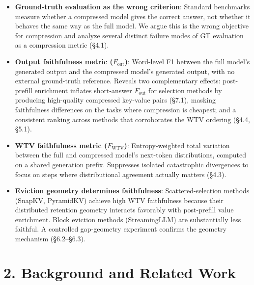 \documentclass[10pt,letterpaper]{article}
\begin{document}
\begin{itemize}
\item
  \textbf{Ground-truth evaluation as the wrong criterion}: Standard
  benchmarks measure whether a compressed model gives the correct
  answer, not whether it behaves the same way as the full model. We
  argue this is the wrong objective for compression and analyze several
  distinct failure modes of GT evaluation as a compression metric
  (§4.1).
\item
  \textbf{Output faithfulness metric (\(F_{\text{out}}\))}: Word-level
  F1 between the full model's generated output and the compressed
  model's generated output, with no external ground-truth reference.
  Reveals two complementary effects: post-prefill enrichment inflates
  short-answer \(F_{\text{out}}\) for selection methods by producing
  high-quality compressed key-value pairs (§7.1), masking faithfulness
  differences on the tasks where compression is cheapest; and a consistent
  ranking across methods that corroborates the WTV ordering (§4.4, §5.1).
\item
  \textbf{WTV faithfulness metric (\(F_{\text{WTV}}\))}: Entropy-weighted
  total variation between the full and compressed model's next-token
  distributions, computed on a shared generation prefix. Suppresses isolated
  catastrophic divergences to focus on steps where distributional agreement
  actually matters (§4.3).
\item
  \textbf{Eviction geometry determines faithfulness}:
  Scattered-selection methods (SnapKV, PyramidKV) achieve high WTV
  faithfulness because their distributed retention geometry interacts
  favorably with post-prefill value enrichment. Block eviction methods
  (StreamingLLM) are substantially less faithful.
  A controlled gap-geometry experiment confirms the geometry
  mechanism (§6.2--§6.3).
\end{itemize}

\hypertarget{background-and-related-work}{%
\section{2. Background and Related
Work}\label{background-and-related-work}}
\end{document}
